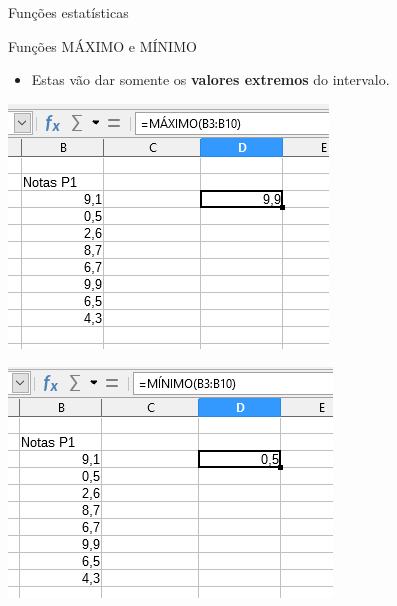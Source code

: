 \begin{frame}{Funções estatísticas}
	\begin{block}{Funções MÁXIMO e MÍNIMO}
		\begin{itemize}
			\item Estas vão dar somente os \textbf{valores extremos} do intervalo.
		\end{itemize}
	\end{block}
	
	\bigskip
	
	\begin{minipage}{0.45\linewidth}
		\centering
		\includegraphics[width=1\linewidth]{Figuras/Ch06/fig54}
	\end{minipage}\hfill
	\begin{minipage}{0.45\linewidth}
		\centering
		\includegraphics[width=1\linewidth]{Figuras/Ch06/fig55}
	\end{minipage}
\end{frame}


